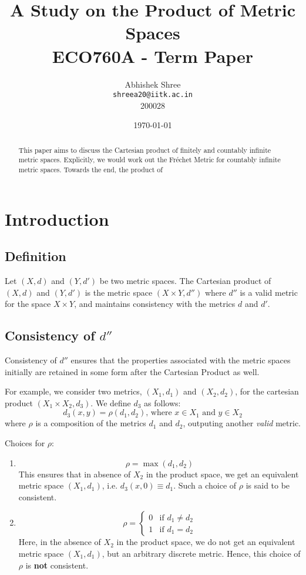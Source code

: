 \documentclass[12pt]{article}
\title{\vspace{80mm}\lightgreyb A Study on the Product of Metric Spaces \\
\lightgreyb ECO760A -  Term Paper}
\author{Abhishek Shree \\ \texttt{shreea20@iitk.ac.in} \\ 200028}
\date{\today}
\let\bold\textbf
\begin{document}
\clearpage\maketitle
\thispagestyle{empty}
\newpage
\setcounter{page}{1}

\renewcommand*{\abstractname}{\color{lightgrey}{Abstract}}

\begin{abstract}
    This paper aims to discuss the Cartesian product of finitely and countably infinite metric spaces. Explicitly, we would work out the Fréchet Metric for countably infinite metric spaces. Towards the end, the product of 
\end{abstract}

\section{Introduction}
\subsection{Definition}
Let $(X, d)$ and $(Y, d')$ be two metric spaces. The Cartesian product of $(X, d)$ and $(Y, d')$ is the metric space $(X \times Y, d'')$ where $d''$ is a valid metric for the space $X \times Y$, and maintains consistency with the metrics $d$ and $d'$.

\subsection{Consistency of $d''$}
Consistency of $d''$ ensures that the properties associated with the metric spaces initially are retained in some form after the Cartesian Product as well.

For example, we consider two metrics, $(X_1, d_1)$ and $(X_2, d_2)$, for the cartesian product $(X_1 \times X_2, d_3)$. 
We define $d_3$ as follows:
$$
d_3(x, y) = \rho(d_1, d_2) \text{, where } x \in X_1 \text{ and } y \in X_2
$$
where $\rho$ is a composition of the metrics $d_1$ and $d_2$, outputing another \emph{valid} metric.

Choices for $\rho$:
\begin{enumerate}
    \item $$\rho = \max(d_1, d_2)$$ 
    This ensures that in absence of $X_2$ in the product space, we get an equivalent metric space $(X_1, d_1)$, i.e. ${d_3(x, 0) \equiv d_1}$. Such a choice of $\rho$ is said to be consistent.
    \item $$\rho = \begin{cases}
        0 & \text{if } d_1 \ne d_2 \\
        1 & \text{if } d_1 = d_2
    \end{cases}$$ 
    Here, in the absence of $X_2$ in the product space, we do not get an equivalent metric space $(X_1, d_1)$, but an arbitrary discrete metric. Hence, this choice of $\rho$ is \bold{not} consistent. 
\end{enumerate}
\end{document}
